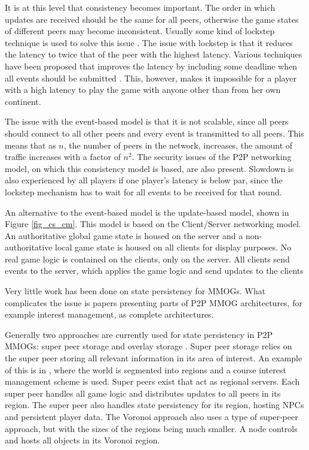 \documentclass[journal,oneside,a4paper,onecolumn]{IEEEtran}
\begin{document}
It is at this level that consistency becomes important. The order in which updates are received should be the same for all peers, otherwise the game states of different peers may become inconsistent. Usually some kind of lockstep technique is used to solve this issue \cite{}. The issue with lockstep is that it reduces the latency to twice that of the peer with the highest latency. Various techniques have been proposed that improves the latency by including some deadline when all events should be submitted \cite{}. This, however, makes it impossible for a player with a high latency to play the game with anyone other than from her own continent.

The issue with the event-based model is that it is not scalable, since all peers should connect to all other peers and every event is transmitted to all peers. This means that as $n$, the number of peers in the network, increases, the amount of traffic increases with a factor of $n^2$. The security issues of the P2P networking model, on which this consistency model is based, are also present. Slowdown is also experienced by all players if one player's latency is below par, since the lockstep mechanism has to wait for all events to be received for that round.

An alternative to the event-based model is the update-based model, shown in Figure \ref{fig_cs_cm}. This model is based on the Client/Server networking model. An authoritative global game state is housed on the server and a non-authoritative local game state is housed on all clients for display purposes. No real game logic is contained on the clients, only on the server. All clients send events to the server, which applies the game logic and send updates to the clients

Very little work has been done on state persistency for MMOGs. What complicates the issue is papers presenting parts of P2P MMOG architectures, for example interest management, as complete architectures.

Generally two approaches are currently used for state persistency in P2P MMOGs: super peer storage \cite{} and overlay storage \cite{}. Super peer storage relies on the super peer storing all relevant information in its area of interest. An example of this is in \cite{}, where the world is segmented into regions and a course interest management scheme is used. Super peers exist that act as regional servers. Each super peer handles all game logic and distributes updates to all peers in its region. The super peer also handles state persistency for its region, hosting NPCs and persistent player data. The Voronoi approach \cite{} also uses a type of super-peer approach, but with the sizes of the regions being much smaller. A node controls and hosts all objects in its Voronoi region.
\end{document}
